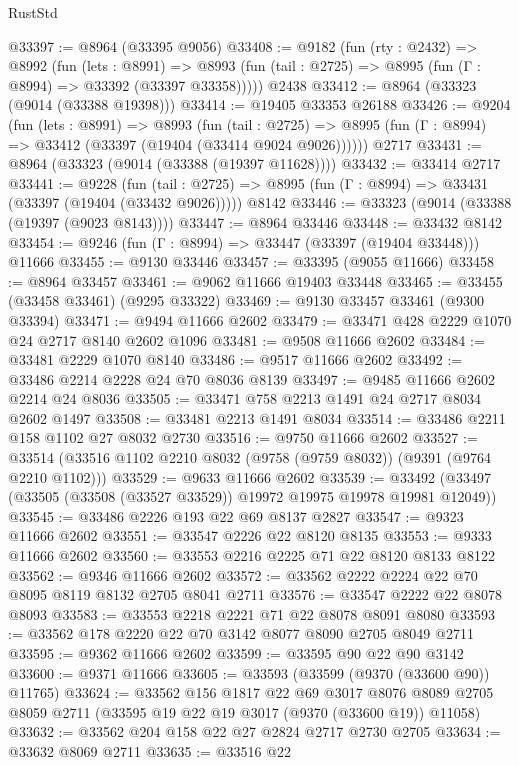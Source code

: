 \begin{lexlean}{RustStd}
\begin{coremodule}
@33397 := @8964 (@33395 @9056)
@33408 := @9182
    (fun (rty : @2432) =>
    @8992
      (fun (lets : @8991) =>
      @8993 (fun (tail : @2725) => @8995 (fun (Γ : @8994) => @33392 (@33397 @33358)))))
    @2438
@33412 := @8964 (@33323 (@9014 (@33388 @19398)))
@33414 := @19405 @33353 @26188
@33426 := @9204
    (fun (lets : @8991) =>
    @8993
      (fun (tail : @2725) =>
      @8995 (fun (Γ : @8994) => @33412 (@33397 (@19404 (@33414 @9024 @9026))))))
    @2717
@33431 := @8964 (@33323 (@9014 (@33388 (@19397 @11628))))
@33432 := @33414 @2717
@33441 := @9228
    (fun (tail : @2725) => @8995 (fun (Γ : @8994) => @33431 (@33397 (@19404 (@33432 @9026)))))
    @8142
@33446 := @33323 (@9014 (@33388 (@19397 (@9023 @8143))))
@33447 := @8964 @33446
@33448 := @33432 @8142
@33454 := @9246 (fun (Γ : @8994) => @33447 (@33397 (@19404 @33448))) @11666
@33455 := @9130 @33446
@33457 := @33395 (@9055 @11666)
@33458 := @8964 @33457
@33461 := @9062 @11666 @19403 @33448
@33465 := @33455 (@33458 @33461) (@9295 @33322)
@33469 := @9130 @33457 @33461 (@9300 @33394)
@33471 := @9494 @11666 @2602
@33479 := @33471 @428 @2229 @1070 @24 @2717 @8140 @2602 @1096
@33481 := @9508 @11666 @2602
@33484 := @33481 @2229 @1070 @8140
@33486 := @9517 @11666 @2602
@33492 := @33486 @2214 @2228 @24 @70 @8036 @8139
@33497 := @9485 @11666 @2602 @2214 @24 @8036
@33505 := @33471 @758 @2213 @1491 @24 @2717 @8034 @2602 @1497
@33508 := @33481 @2213 @1491 @8034
@33514 := @33486 @2211 @158 @1102 @27 @8032 @2730
@33516 := @9750 @11666 @2602
@33527 := @33514 (@33516 @1102 @2210 @8032 (@9758 (@9759 @8032)) (@9391 (@9764 @2210 @1102)))
@33529 := @9633 @11666 @2602
@33539 := @33492 (@33497 (@33505 (@33508 (@33527 @33529)) @19972 @19975 @19978 @19981 @12049))
@33545 := @33486 @2226 @193 @22 @69 @8137 @2827
@33547 := @9323 @11666 @2602
@33551 := @33547 @2226 @22 @8120 @8135
@33553 := @9333 @11666 @2602
@33560 := @33553 @2216 @2225 @71 @22 @8120 @8133 @8122
@33562 := @9346 @11666 @2602
@33572 := @33562 @2222 @2224 @22 @70 @8095 @8119 @8132 @2705 @8041 @2711
@33576 := @33547 @2222 @22 @8078 @8093
@33583 := @33553 @2218 @2221 @71 @22 @8078 @8091 @8080
@33593 := @33562 @178 @2220 @22 @70 @3142 @8077 @8090 @2705 @8049 @2711
@33595 := @9362 @11666 @2602
@33599 := @33595 @90 @22 @90 @3142
@33600 := @9371 @11666
@33605 := @33593 (@33599 (@9370 (@33600 @90)) @11765)
@33624 := @33562
    @156
    @1817
    @22
    @69
    @3017
    @8076
    @8089
    @2705
    @8059
    @2711
    (@33595 @19 @22 @19 @3017 (@9370 (@33600 @19)) @11058)
@33632 := @33562 @204 @158 @22 @27 @2824 @2717 @2730 @2705
@33634 := @33632 @8069 @2711
@33635 := @33516 @22

\end{coremodule}
\end{lexlean}
